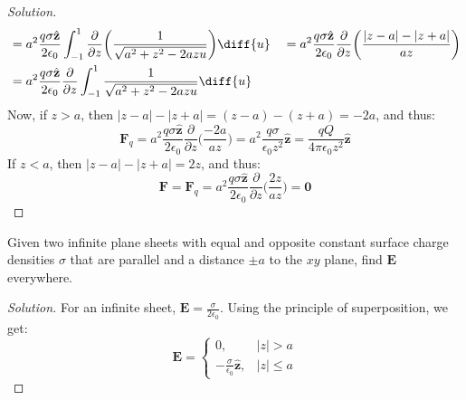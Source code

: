 \documentclass[crop=false,class=article,oneside]{standalone}
\begin{document}
\begin{proof}[Solution]
\begin{align*}
                &=a^{2}\frac{q\sigma\hat{\mathbf{z}}}{2\epsilon_{0}}
                \int_{-1}^{1}\frac{\partial}{\partial{z}}
                \bigg(\frac{1}{\sqrt{a^{2}+z^{2}-2azu}}\bigg)\diff{u}
                &
                &=a^{2}\frac{q\sigma\hat{\mathbf{z}}}{2\epsilon_{0}}
                \frac{\partial}{\partial{z}}
                \bigg(\frac{|z-a|-|z+a|}{az}\bigg)\\
                &=a^{2}\frac{q\sigma \hat{\mathbf{z}}}{2\epsilon_{0}}
                \frac{\partial}{\partial{z}}
                \int_{-1}^{1}\frac{1}{\sqrt{a^{2}+z^{2}-2azu}}\diff{u}\\
            \end{align*}
            Now, if $z>a$, then $|z-a|-|z+a|=(z-a)-(z+a)=-2a$, and thus:
            \begin{equation*}
                \mathbf{F}_{q}
                =a^{2}\frac{q\sigma\hat{\mathbf{z}}}{2\epsilon_{0}}
                \frac{\partial}{\partial{z}}\bigg(\frac{-2a}{az}\bigg)
                =a^{2}\frac{q\sigma}{\epsilon_{0}z^{2}}\hat{\mathbf{z}}
                =\frac{qQ}{4\pi\epsilon_{0}z^{2}}\hat{\mathbf{z}}\tag{$z>a$}
            \end{equation*}
            If $z<a$, then $|z-a|-|z+a|=2z$, and thus:
            \begin{equation*}
                \mathbf{F}=\mathbf{F}_{q}=a^{2}\frac{q\sigma
                \hat{\mathbf{z}}}{2\epsilon_{0}}
                \frac{\partial}{\partial z}\bigg(\frac{2z}{az}\bigg)
                =\mathbf{0}\tag{$z<a$}
            \end{equation*}
        \end{proof}
        \begin{problem}[Wangsness 3-9]
            Given two infinite plane sheets with equal and opposite
            constant surface charge densities $\sigma$ that are
            parallel and a distance $\pm a$ to the $xy$ plane,
            find $\mathbf{E}$ everywhere.
        \end{problem}
        \begin{proof}[Solution]
            For an infinite sheet,
            $\mathbf{E}=\frac{\sigma}{2\epsilon_{0}}$.
            Using the principle of superposition, we get:
            \begin{equation*}
                \mathbf{E}=
                \begin{cases}
                    0,
                    &|z|>a\\
                    -\frac{\sigma}
                          {\epsilon_{0}}\hat{\mathbf{z}},
                    &|z|\leq{a}
                \end{cases}
            \end{equation*}
        \end{proof}
\end{document}
